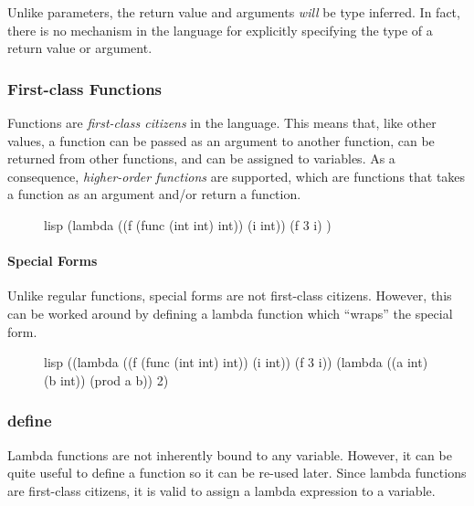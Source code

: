 Unlike parameters, the return value and arguments \textit{will} be type inferred. In fact, there is no mechanism in the language for explicitly specifying the type of a return value or argument.

\subsubsection{First-class Functions}
Functions are \textit{first-class citizens} in the language. This means that, like other values, a function can be passed as an argument to another function, can be returned from other functions, and can be assigned to variables. As a consequence, \textit{higher-order functions} are supported, which are functions that takes a function as an argument and/or return a function.

\begin{figure}[htp]
    \centering
    \begin{cminted}[autogobble=true]{lisp}
        (lambda ((f (func (int int) int))
                 (i int))
          (f 3 i)
        )
    \end{cminted}
    \captionsetup[figure]{font=small}
\end{figure}

\paragraph{Special Forms}
Unlike regular functions, special forms are not first-class citizens. However, this can be worked around by defining a lambda function which ``wraps'' the special form.

\begin{figure}[htp]
    \centering
    \begin{cminted}[autogobble=true]{lisp}
        ((lambda ((f (func (int int) int))
                 (i int))
          (f 3 i))
        (lambda ((a int) (b int)) (prod a b)) 2)
    \end{cminted}
    \captionsetup[figure]{font=small}
\end{figure}

\subsubsection{define}
Lambda functions are not inherently bound to any variable. However, it can be quite useful to define a function so it can be re-used later. Since lambda functions are first-class citizens, it is valid to assign a lambda expression to a variable.

